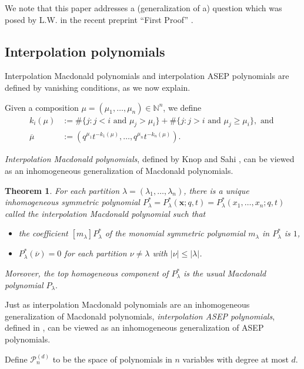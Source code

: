 \documentclass[12pt]{amsart}
\newtheorem{thm}{Theorem}[section]
\theoremstyle{definition}
\newcommand{\xx}{\mathbf x}
\newcommand{\mcP}{\mathcal P}
\newcommand{\NN}{\mathbb N}
\begin{document}
We note that this paper addresses a (generalization of a) question which
was posed by L.W. in the recent preprint
``First Proof'' \cite{FirstProof}.  

\subsection{Interpolation polynomials}
Interpolation Macdonald polynomials and interpolation ASEP polynomials are defined by vanishing conditions, as we now explain.

Given a composition $\mu=(\mu_1,\dots,\mu_n)\in\NN^n$, we define
\begin{align} \label{eq:k}
k_i(\mu)&:=\#\{j:j<i \text{ and }\mu_j>\mu_i\}+\#\{j:j>i \text{ and }\mu_j\geq \mu_i\}, \text{ and }\\\label{eq:k2}
\overline\mu&:=\left(q^{\mu_1} t^{-k_1(\mu)},\dots,q^{\mu_n} t^{-k_n(\mu)}\right).
\end{align}


\emph{Interpolation Macdonald polynomials}, defined by Knop and Sahi \cite{Knop1997b, Sahi1996}, can be viewed as an inhomogeneous generalization of Macdonald polynomials.
\begin{thm}\cite{Knop1997b, Sahi1996}\label{def:intMacdonald}
For each partition $\lambda=(\lambda_1,\dots,\lambda_n)$, there is a unique inhomogeneous symmetric polynomial $P^*_{\lambda} =P_{\lambda}^*(\xx;q,t) = P_{\lambda}^*(x_1,\dots,x_n;q,t)$ 
called the \emph{interpolation Macdonald polynomial} such that 
\begin{itemize}
    \item the coefficient $[m_{\lambda}]P_{\lambda}^*$ of the 
    monomial symmetric polynomial $m_{\lambda}$ in $P_{\lambda}^*$ is $1$,
    \item $P_{\lambda}^*(\overline{\nu}) = 0$ for each partition $\nu \neq \lambda$ with $|\nu| \leq |\lambda|$.
\end{itemize}
Moreover, the top homogeneous component of 
$P_{\lambda}^*$ is the usual Macdonald polynomial
$P_{\lambda}.$
\end{thm}


 
Just as interpolation Macdonald polynomials are an inhomogeneous generalization of Macdonald polynomials, 
\emph{interpolation ASEP polynomials}, defined in \cite{BenDaliWilliams2025}, can be viewed as an inhomogeneous generalization of ASEP polynomials. 

Define $\mcP_n^{(d)}$ to be the space of polynomials in $n$ variables with degree at most $d$.
\end{document}
